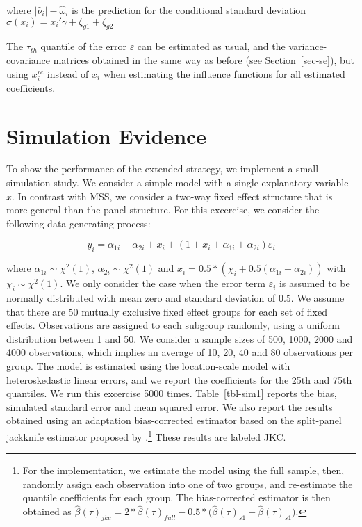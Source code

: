 \documentclass[
  authoryear,
  review,
  1p]{elsarticle}
\begin{document}
where \(|\hat\nu_{i}|- \hat \omega_{i}\) is the prediction for the
conditional standard deviation
\(\sigma(x_i)=x_{i}' \gamma + \zeta_{g1} + \zeta_{g2}\)

The \(\tau_{th}\) quantile of the error \(\varepsilon\) can be estimated
as usual, and the variance-covariance matrices obtained in the same way
as before (see Section~\ref{sec-se}), but using \(x_{i}^{rc}\) instead
of \(x_{i}\) when estimating the influence functions for all estimated
coefficients.

\section{Simulation Evidence}\label{simulation-evidence}

To show the performance of the extended strategy, we implement a small
simulation study. We consider a simple model with a single explanatory
variable \(x\). In contrast with MSS, we consider a two-way fixed effect
structure that is more general than the panel structure. For this
excercise, we consider the following data generating process:

\[y_i = \alpha_{1i} + \alpha_{2i} + x_i + (1+x_i + \alpha_{1i} + \alpha_{2i} ) \varepsilon_i
\]

where \(\alpha_{1i}\sim \chi^2(1)\), \(\alpha_{2i} \sim \chi^2(1)\) and
\(x_i = 0.5 * (\chi_i +0.5(\alpha_{1i}+\alpha_{2i}))\) with
\(\chi_i \sim \chi^2(1)\). We only consider the case when the error term
\(\varepsilon_i\) is assumed to be normally distributed with mean zero
and standard deviation of 0.5. We assume that there are 50 mutually
exclusive fixed effect groups for each set of fixed effects.
Observations are assigned to each subgroup randomly, using a uniform
distribution between 1 and 50. We consider a sample sizes of 500, 1000,
2000 and 4000 observations, which implies an average of 10, 20, 40 and
80 observations per group. The model is estimated using the
location-scale model with heteroskedastic linear errors, and we report
the coefficients for the 25th and 75th quantiles. We run this excercise
5000 times. Table~\ref{tbl-sim1} reports the bias, simulated standard
error and mean squared error. We also report the results obtained using
an adaptation bias-corrected estimator based on the split-panel
jackknife estimator proposed by \citet{dhaene2015}.\footnote{For the
  implementation, we estimate the model using the full sample, then,
  randomly assign each observation into one of two groups, and
  re-estimate the quantile coefficients for each group. The
  bias-corrected estimator is then obtained as
  \(\hat\beta(\tau)_{jkc}=2*\hat\beta(\tau)_{full}-0.5*\big(\hat\beta(\tau)_{s1}+\hat\beta(\tau)_{s1}\big)\).}
These results are labeled JKC.
\end{document}
